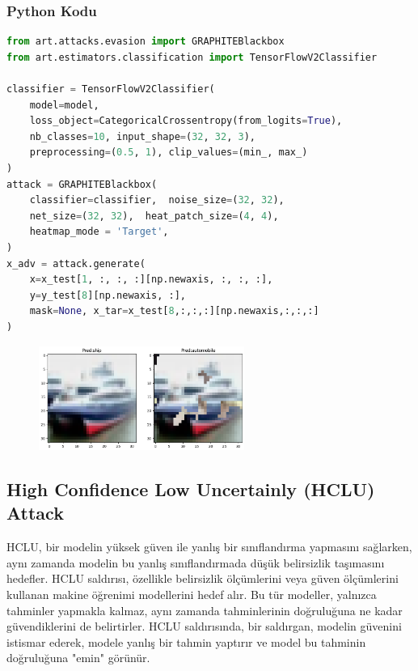 \subsubsection{Python Kodu}

\begin{lstlisting}[language=Python]
from art.attacks.evasion import GRAPHITEBlackbox
from art.estimators.classification import TensorFlowV2Classifier

classifier = TensorFlowV2Classifier(
    model=model,
    loss_object=CategoricalCrossentropy(from_logits=True),
    nb_classes=10, input_shape=(32, 32, 3),
    preprocessing=(0.5, 1), clip_values=(min_, max_)
)
attack = GRAPHITEBlackbox(
    classifier=classifier,  noise_size=(32, 32), 
    net_size=(32, 32),  heat_patch_size=(4, 4),
    heatmap_mode = 'Target',
)
x_adv = attack.generate(
    x=x_test[1, :, :, :][np.newaxis, :, :, :], 
    y=y_test[8][np.newaxis, :], 
    mask=None, x_tar=x_test[8,:,:,:][np.newaxis,:,:,:]
)
\end{lstlisting}

\begin{figure}[h]
    \centering
    \includegraphics[width=0.6\textwidth]{images/graphite_results.png}
    \caption{}
\end{figure}

\newpage

\subsection{High Confidence Low Uncertainly (HCLU) Attack}

HCLU, bir modelin yüksek güven ile yanlış bir sınıflandırma yapmasını sağlarken, aynı zamanda modelin bu yanlış sınıflandırmada düşük belirsizlik taşımasını hedefler. HCLU saldırısı, özellikle belirsizlik ölçümlerini veya güven ölçümlerini kullanan makine öğrenimi modellerini hedef alır. Bu tür modeller, yalnızca tahminler yapmakla kalmaz, aynı zamanda tahminlerinin doğruluğuna ne kadar güvendiklerini de belirtirler. HCLU saldırısında, bir saldırgan, modelin güvenini istismar ederek, modele yanlış bir tahmin yaptırır ve model bu tahminin doğruluğuna "emin" görünür.

